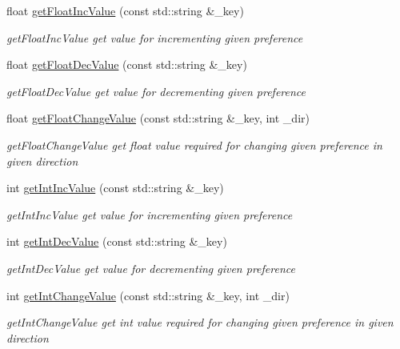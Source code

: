 \begin{DoxyCompactItemize}
\item 
float \hyperlink{class_prefs_a152c738ff64ba39640067d01b9c1c68d}{get\+Float\+Inc\+Value} (const std\+::string \&\+\_\+key)
\begin{DoxyCompactList}\small\item\em get\+Float\+Inc\+Value get value for incrementing given preference \end{DoxyCompactList}\item 
float \hyperlink{class_prefs_ad36b9c6a831366911a40abb4dbfbd673}{get\+Float\+Dec\+Value} (const std\+::string \&\+\_\+key)
\begin{DoxyCompactList}\small\item\em get\+Float\+Dec\+Value get value for decrementing given preference \end{DoxyCompactList}\item 
float \hyperlink{class_prefs_a3129674442845c24ed3a4bab58354179}{get\+Float\+Change\+Value} (const std\+::string \&\+\_\+key, int \+\_\+dir)
\begin{DoxyCompactList}\small\item\em get\+Float\+Change\+Value get float value required for changing given preference in given direction \end{DoxyCompactList}\item 
int \hyperlink{class_prefs_aef0285b443ab4e5aaaa2d2dfab77d44d}{get\+Int\+Inc\+Value} (const std\+::string \&\+\_\+key)
\begin{DoxyCompactList}\small\item\em get\+Int\+Inc\+Value get value for incrementing given preference \end{DoxyCompactList}\item 
int \hyperlink{class_prefs_a3ea75fdb113cde7ed5578ed341bbbcb1}{get\+Int\+Dec\+Value} (const std\+::string \&\+\_\+key)
\begin{DoxyCompactList}\small\item\em get\+Int\+Dec\+Value get value for decrementing given preference \end{DoxyCompactList}\item 
int \hyperlink{class_prefs_a7216daf0f85aed4d4d5756d91963bc6d}{get\+Int\+Change\+Value} (const std\+::string \&\+\_\+key, int \+\_\+dir)
\begin{DoxyCompactList}\small\item\em get\+Int\+Change\+Value get int value required for changing given preference in given direction \end{DoxyCompactList}\item 

\end{DoxyCompactItemize}
